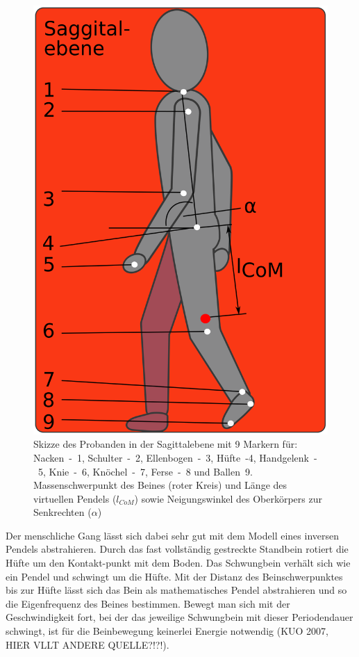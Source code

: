\begin{figure}
	\includegraphics[width=\linewidth]{bilder/Einleitung/Proband_Pendel}
	\caption[Inverses Pendel und untersuchte Gelenke]{Skizze des Probanden in der Sagittalebene mit 9 Markern für: Nacken~-~1, Schulter~-~2, Ellenbogen~-~3, Hüfte~-4, Handgelenk~-~5, Knie~-~6, Knöchel~-~7, Ferse~-~8 und Ballen~9. Massenschwerpunkt des Beines (roter Kreis) und Länge des virtuellen Pendels ($l_{CoM}$) sowie Neigungswinkel des Oberkörpers zur Senkrechten ($\alpha$)}
	\label{fig:Proband_Pendel}
\end{figure}
Der menschliche Gang lässt sich dabei sehr gut mit dem Modell eines inversen Pendels abstrahieren. Durch das fast vollständig gestreckte Standbein rotiert die Hüfte um den Kontakt-punkt mit dem Boden. Das Schwungbein verhält sich wie ein Pendel und schwingt um die Hüfte. Mit der Distanz des Beinschwerpunktes bis zur Hüfte lässt sich das Bein als mathematisches Pendel abstrahieren und so die Eigenfrequenz des Beines bestimmen. Bewegt man sich mit der Geschwindigkeit fort, bei der das jeweilige Schwungbein mit dieser Periodendauer schwingt, ist für die Beinbewegung keinerlei Energie notwendig (KUO 2007, HIER VLLT ANDERE QUELLE?!?!).\\
